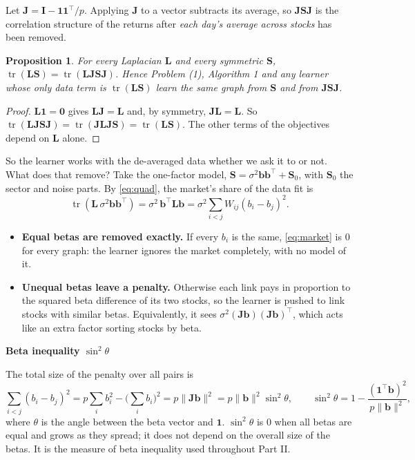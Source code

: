 \documentclass[11pt,a4paper]{article}
\newcommand{\Lap}{\mathbf{L}}
\newcommand{\Imat}{\mathbf{I}}
\newcommand{\Smat}{\mathbf{S}}
\newcommand{\Jmat}{\mathbf{J}}
\newcommand{\bvec}{\mathbf{b}}
\newcommand{\one}{\mathbf{1}}
\newcommand{\tr}{\operatorname{tr}}
\newtheorem{proposition}{Proposition}
\theoremstyle{remark}
\newenvironment{defn}[1]
 {\par\vspace{2mm}\begin{lrbox}{\defnbox}%
  \begin{minipage}{\dimexpr\textwidth-16pt\relax}\small\textcolor{BlueLink}{\textbf{#1}}\par\vspace{0.6mm}}
 {\end{minipage}\end{lrbox}%
  \noindent\setlength{\fboxsep}{6pt}\setlength{\fboxrule}{.4pt}%
  \fcolorbox{BlueLink!40}{PanelBlue}{\usebox{\defnbox}}\par\vspace{2mm}}
\begin{document}
Let $\Jmat=\Imat-\one\one^\top/p$. Applying $\Jmat$ to a vector subtracts its average, so
$\Jmat\Smat\Jmat$ is the correlation structure of the returns after \emph{each day's
average across stocks} has been removed.

\begin{proposition}\label{prop:implicit}
For every Laplacian $\Lap$ and every symmetric $\Smat$,
$\tr(\Lap\Smat)=\tr(\Lap\Jmat\Smat\Jmat)$. Hence Problem (1), Algorithm 1 and any learner
whose only data term is $\tr(\Lap\Smat)$ learn the same graph from $\Smat$ and from
$\Jmat\Smat\Jmat$.
\end{proposition}
\begin{proof}
$\Lap\one=\mathbf0$ gives $\Lap\Jmat=\Lap$ and, by symmetry, $\Jmat\Lap=\Lap$. So
$\tr(\Lap\Jmat\Smat\Jmat)=\tr(\Jmat\Lap\Jmat\Smat)=\tr(\Lap\Smat)$. The other terms of the
objectives depend on $\Lap$ alone.
\end{proof}

So the learner works with the de-averaged data whether we ask it to or not. What does
that remove? Take the one-factor model, $\Smat=\sigma^2\bvec\bvec^\top+\Smat_0$, with
$\Smat_0$ the sector and noise parts. By \eqref{eq:quad}, the market's share of the data
fit is
\begin{equation}\label{eq:market}
  \tr(\Lap\,\sigma^2\bvec\bvec^\top)=\sigma^2\,\bvec^\top\Lap\bvec=\sigma^2\sum_{i<j}W_{ij}(b_i-b_j)^2 .
\end{equation}

\begin{itemize}
\item \textbf{Equal betas are removed exactly.} If every $b_i$ is the same, \eqref{eq:market}
  is 0 for every graph: the learner ignores the market completely, with no model of it.
\item \textbf{Unequal betas leave a penalty.} Otherwise each link pays in proportion to
  the squared beta difference of its two stocks, so the learner is pushed to link
  stocks with similar betas. Equivalently, it sees $\sigma^2(\Jmat\bvec)(\Jmat\bvec)^\top$,
  which acts like an extra factor sorting stocks by beta.
\end{itemize}

\begin{defn}{Beta inequality $\sin^2\theta$}
The total size of the penalty over all pairs is
\[
  \sum_{i<j}(b_i-b_j)^2=p\sum_ib_i^2-\Big(\sum_ib_i\Big)^2=p\lVert\Jmat\bvec\rVert^2
  =p\lVert\bvec\rVert^2\sin^2\theta,\qquad
  \sin^2\theta=1-\frac{(\one^\top\bvec)^2}{p\lVert\bvec\rVert^2},
\]
where $\theta$ is the angle between the beta vector and $\one$. $\sin^2\theta$ is 0 when
all betas are equal and grows as they spread; it does not depend on the overall size of
the betas. It is the measure of beta inequality used throughout Part II.
\end{defn}
\end{document}
